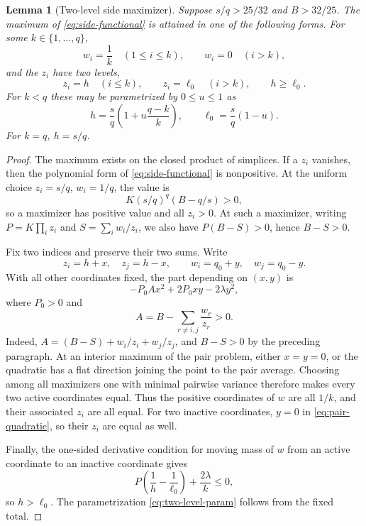 \documentclass[11pt]{article}
\newtheorem{lemma}[theorem]{Lemma}
\theoremstyle{definition}
\begin{document}
\begin{lemma}[Two-level side maximizer]\label{lem:two-level}
Suppose $s/q>25/32$ and $B>32/25$.  The maximum of
\eqref{eq:side-functional} is attained in one of the following forms.  For some $k\in\{1,\ldots,q\}$,
\[
 w_i=\frac1k\quad(1\le i\le k),
 \qquad w_i=0\quad(i>k),
\]
and the $z_i$ have two levels,
\[
 z_i=h\quad(i\le k),
 \qquad z_i=\ell_0\quad(i>k),
 \qquad h\ge\ell_0.
\]
For $k<q$ these may be parametrized by $0\le u\le1$ as
\begin{equation}\label{eq:two-level-param}
 h=\frac{s}{q}\left(1+u\frac{q-k}{k}\right),
 \qquad
 \ell_0=\frac{s}{q}(1-u).
\end{equation}
For $k=q$, $h=s/q$.
\end{lemma}

\begin{proof}
The maximum exists on the closed product of simplices.  If a $z_i$ vanishes,
then the polynomial form of \eqref{eq:side-functional} is nonpositive.  At
the uniform choice $z_i=s/q$, $w_i=1/q$, the value is
\[
 K(s/q)^q(B-q/s)>0,
\]
so a maximizer has positive value and all $z_i>0$.  At such a maximizer,
writing $P=K\prod_i z_i$ and $S=\sum_iw_i/z_i$, we also have
$P(B-S)>0$, hence $B-S>0$.

Fix two indices and preserve their two sums.  Write
\[
 z_i=h+x,\quad z_j=h-x,
 \qquad
 w_i=q_0+y,\quad w_j=q_0-y.
\]
With all other coordinates fixed, the part depending on $(x,y)$ is
\begin{equation}\label{eq:pair-quadratic}
 -P_0A x^2+2P_0xy-2\lambda y^2,
\end{equation}
where $P_0>0$ and
\[
 A=B-\sum_{r\ne i,j}\frac{w_r}{z_r}>0.
\]
Indeed, $A=(B-S)+w_i/z_i+w_j/z_j$, and $B-S>0$ by the
preceding paragraph.  At an interior maximum of the pair problem, either
$x=y=0$, or the quadratic has a flat direction joining the point to the pair
average.  Choosing among all maximizers one with minimal pairwise variance
therefore makes every two active coordinates equal.  Thus the positive
coordinates of $w$ are all $1/k$, and their associated $z_i$ are all equal.
For two inactive coordinates, $y=0$ in \eqref{eq:pair-quadratic}, so their
$z_i$ are equal as well.

Finally, the one-sided derivative condition for moving mass of $w$ from an
active coordinate to an inactive coordinate gives
\[
 P\left(\frac1h-\frac1{\ell_0}\right)+\frac{2\lambda}{k}\le0,
\]
so $h>\ell_0$.  The parametrization \eqref{eq:two-level-param} follows from
the fixed total.
\end{proof}
\end{document}

